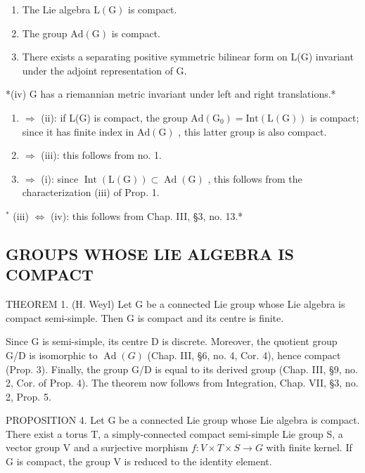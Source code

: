 \begin{enumerate}
\def\labelenumi{(\roman{enumi})}
\item
  The Lie algebra \(\mathrm{L}(\mathrm{G})\) is compact.
\item
  The group \(\mathrm{Ad}(\mathrm{G})\) is compact.
\item
  There exists a separating positive symmetric bilinear form on L(G) invariant under the adjoint representation of G.
\end{enumerate}

*(iv) G has a riemannian metric invariant under left and right translations.*

\begin{enumerate}
\def\labelenumi{(\roman{enumi})}
\item
  \(\Longrightarrow\) (ii): if L(G) is compact, the group \(\mathrm{Ad}(\mathrm{G}_{0}) = \mathrm{Int}(\mathrm{L}(\mathrm{G}))\) is compact; since it has finite index in \(\mathrm{Ad}(\mathrm{G})\) , this latter group is also compact.
\item
  \(\Longrightarrow\) (iii): this follows from no. 1.
\item
  \(\Longrightarrow\) (i): since \(\operatorname{Int}(\mathrm{L}(\mathrm{G})) \subset \operatorname{Ad}(\mathrm{G})\) , this follows from the characterization (iii) of Prop. 1.
\end{enumerate}

\(^{*}\) (iii) \(\Longleftrightarrow\) (iv): this follows from Chap. III, §3, no. 13.*

\subsection{GROUPS WHOSE LIE ALGEBRA IS COMPACT}

THEOREM 1. (H. Weyl) Let G be a connected Lie group whose Lie algebra is compact semi-simple. Then G is compact and its centre is finite.

Since G is semi-simple, its centre D is discrete. Moreover, the quotient group G/D is isomorphic to \(\operatorname{Ad}(G)\) (Chap. III, §6, no. 4, Cor. 4), hence compact (Prop. 3). Finally, the group G/D is equal to its derived group (Chap. III, §9, no. 2, Cor. of Prop. 4). The theorem now follows from Integration, Chap. VII, §3, no. 2, Prop. 5.

PROPOSITION 4. Let G be a connected Lie group whose Lie algebra is compact. There exist a torus T, a simply-connected compact semi-simple Lie group S, a vector group V and a surjective morphism \(f: V \times T \times S \to G\) with finite kernel. If G is compact, the group V is reduced to the identity element.

